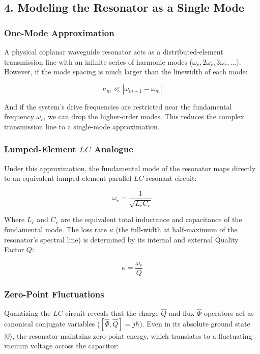 \documentclass[
]{article}
\begin{document}
\subsection{4. Modeling the Resonator as a Single
Mode}\label{modeling-the-resonator-as-a-single-mode}

\subsubsection{One-Mode Approximation}\label{one-mode-approximation}

A physical coplanar waveguide resonator acts as a distributed-element
transmission line with an infinite series of harmonic modes
(\(\omega_r, 2\omega_r, 3\omega_r, \dots\)). However, if the mode
spacing is much larger than the linewidth of each mode:

\[\kappa_m \ll |\omega_{m+1} - \omega_m|\]

And if the system's drive frequencies are restricted near the
fundamental frequency \(\omega_r\), we can drop the higher-order modes.
This reduces the complex transmission line to a single-mode
approximation.

\subsubsection{\texorpdfstring{Lumped-Element \(LC\)
Analogue}{Lumped-Element LC Analogue}}\label{lumped-element-lc-analogue}

Under this approximation, the fundamental mode of the resonator maps
directly to an equivalent lumped-element parallel \(LC\) resonant
circuit:

\[\omega_r = \frac{1}{\sqrt{L_r C_r}}\]

Where \(L_r\) and \(C_r\) are the equivalent total inductance and
capacitance of the fundamental mode. The loss rate \(\kappa\) (the
full-width at half-maximum of the resonator's spectral line) is
determined by its internal and external Quality Factor \(Q\):

\[\kappa = \frac{\omega_r}{Q}\]

\subsubsection{Zero-Point Fluctuations}\label{zero-point-fluctuations}

Quantizing the \(LC\) circuit reveals that the charge \(\hat{Q}\) and
flux \(\hat{\Phi}\) operators act as canonical conjugate variables
(\([\hat{\Phi}, \hat{Q}] = j\hbar\)). Even in its absolute ground state
\(|0\rangle\), the resonator maintains zero-point energy, which
translates to a fluctuating vacuum voltage across the capacitor:
\end{document}
